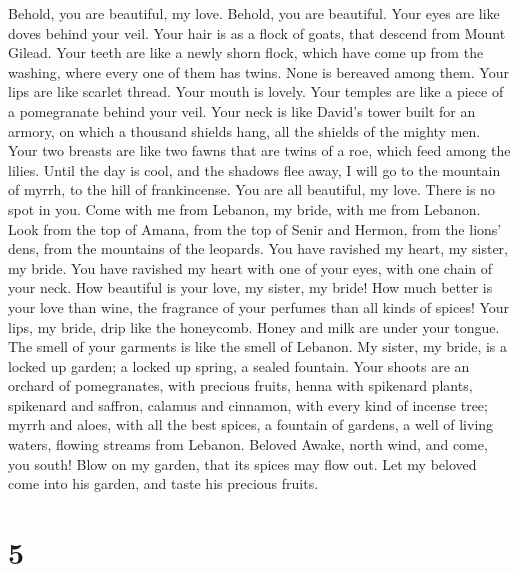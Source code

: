  Behold, you are beautiful, my love. Behold, you are
beautiful. Your eyes are like doves behind your veil. Your hair is as a
flock of goats, that descend from Mount Gilead.  Your
teeth are like a newly shorn flock, which have come up from the washing,
where every one of them has twins. None is bereaved among them.
 Your lips are like scarlet thread. Your mouth is lovely.
Your temples are like a piece of a pomegranate behind your veil.
 Your neck is like David's tower built for an armory, on
which a thousand shields hang, all the shields of the mighty men.
 Your two breasts are like two fawns that are twins of a
roe, which feed among the lilies.  Until the day is cool,
and the shadows flee away, I will go to the mountain of myrrh, to the
hill of frankincense.  You are all beautiful, my love.
There is no spot in you.  Come with me from Lebanon, my
bride, with me from Lebanon. Look from the top of Amana, from the top of
Senir and Hermon, from the lions' dens, from the mountains of the
leopards.  You have ravished my heart, my sister, my
bride. You have ravished my heart with one of your eyes, with one chain
of your neck.  How beautiful is your love, my sister, my
bride! How much better is your love than wine, the fragrance of your
perfumes than all kinds of spices!  Your lips, my bride,
drip like the honeycomb. Honey and milk are under your tongue. The smell
of your garments is like the smell of Lebanon.  My
sister, my bride, is a locked up garden; a locked up spring, a sealed
fountain.  Your shoots are an orchard of pomegranates,
with precious fruits, henna with spikenard plants, 
spikenard and saffron, calamus and cinnamon, with every kind of incense
tree; myrrh and aloes, with all the best spices,  a
fountain of gardens, a well of living waters, flowing streams from
Lebanon. Beloved  Awake, north wind, and come, you south!
Blow on my garden, that its spices may flow out. Let my beloved come
into his garden, and taste his precious fruits.

\hypertarget{section-4}{%
\section{5}\label{section-4}}

